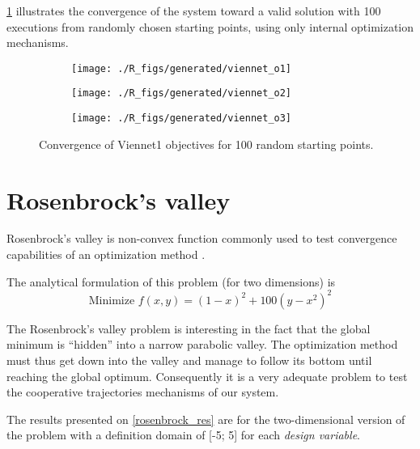 \figurename{} \ref{viennet_res} illustrates the convergence of the system toward a valid solution with 100 executions from randomly chosen starting points, using only internal optimization mechanisms.

\begin{figure}[h]

	\begin{subfigure}[b]{0.32\textwidth}
		\centering
		\texttt{[image: ./R\_figs/generated/viennet\_o1]}	
	\end{subfigure}
	\hfill%
	\begin{subfigure}[b]{0.32\textwidth}
		\centering
		\texttt{[image: ./R\_figs/generated/viennet\_o2]}	
	\end{subfigure}
	\hfill%
	\begin{subfigure}[b]{0.32\textwidth}
		\centering
		\texttt{[image: ./R\_figs/generated/viennet\_o3]}	
	\end{subfigure}
	\caption{Convergence of Viennet1 objectives for 100 random starting points.}
	\label{viennet_res}
\end{figure}

\section{Rosenbrock's valley}

Rosenbrock's valley is non-convex function commonly used to test convergence capabilities of an optimization method \cite{Rosenbrock01011960}.

The analytical formulation of this problem (for two dimensions) is 
$$\text{Minimize } f(x,y) = (1-x)^2 + 100(y - x^2)^2$$

The Rosenbrock's valley problem is interesting in the fact that the global minimum is \enquote{hidden} into a narrow parabolic valley. The optimization method must thus get down into the valley and manage to follow its bottom until reaching the global optimum. Consequently it is a very adequate problem to test the cooperative trajectories mechanisms of our system.

The results presented on \figurename{} \ref{rosenbrock_res} are for the two-dimensional version of the problem with a definition domain of [-5; 5] for each \emph{design variable}.

